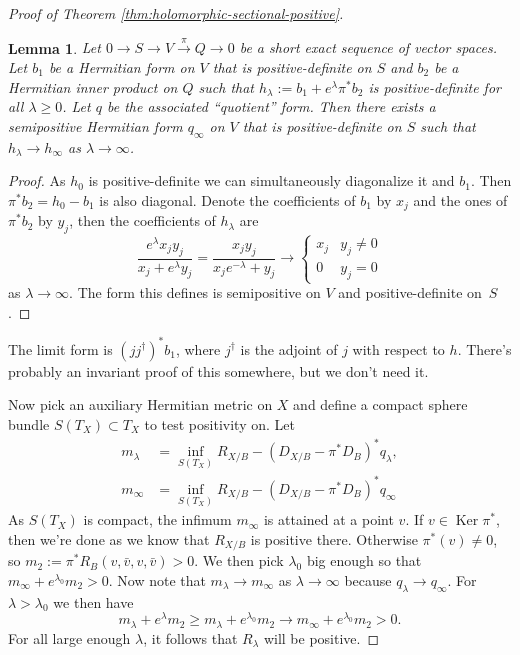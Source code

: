\documentclass[10pt,a4paper]{amsart}
\newtheorem{lemm}[theo]{Lemma}
\theoremstyle{definition}
\DeclareMathOperator{\Ker}{Ker}
\begin{document}
\begin{proof}[Proof of Theorem \ref{thm:holomorphic-sectional-positive}]
\begin{lemm}
Let $0 \to S \to V \stackrel{\pi}{\to} Q \to 0$ be a short exact sequence of vector spaces.
Let $b_{1}$ be a Hermitian form on $V$ that is positive-definite on $S$ and $b_{2}$ be a Hermitian inner product on $Q$ such that $h_{\lambda} := b_{1} + e^{\lambda} \pi^{*} b_{2}$ is positive-definite for all $\lambda \geq 0$.
Let $q$ be the associated ``quotient'' form.
Then there exists a semipositive Hermitian form $q_{\infty}$ on $V$ that is positive-definite on $S$ such that $h_{\lambda} \to h_{\infty}$ as $\lambda \to \infty$.
\end{lemm}


\begin{proof}
As $h_{0}$ is positive-definite we can simultaneously diagonalize it and $b_{1}$.
Then $\pi^{*}b_{2} = h_{0} - b_{1}$ is also diagonal.
Denote the coefficients of $b_{1}$ by $x_{j}$ and the ones of $\pi^{*}b_{2}$ by $y_{j}$, then the coefficients of $h_{\lambda}$ are
\[
  \frac{e^{\lambda}x_{j} y_{j}}{x_{j} + e^{\lambda} y_{j}}
  = \frac{x_{j} y_{j}}{x_{j}e^{-\lambda} + y_{j}}
  \to
  \begin{cases}
    x_{j} & y_{j} \not= 0
    \\
    0 & y_{j} = 0
  \end{cases}
\]
as $\lambda \to \infty$.
The form this defines is semipositive on $V$ and positive-definite on~$S$.%
\end{proof}

The limit form is $(j j^{\dagger})^{*}b_{1}$, where $j^{\dagger}$ is the adjoint of $j$ with respect to $h$. There's probably an invariant proof of this somewhere, but we don't need it.

Now pick an auxiliary Hermitian metric on $X$ and define a compact sphere bundle
$S(T_X) \subset T_X$ to test positivity on.
Let
\begin{align*}
m_\lambda &=
\inf_{S(T_X)} R_{X/B}
- (D_{X/B} - \pi^* D_{B})^* q_{\lambda},
\\
m_\infty &=
\inf_{S(T_X)} R_{X/B}
- (D_{X/B} - \pi^* D_{B})^* q_{\infty}
\end{align*}
As $S(T_X)$ is compact, the infimum $m_\infty$ is attained at a point $v$.
If $v \in \Ker \pi^*$, then we're done as we know that $R_{X/B}$ is positive
there.
Otherwise $\pi^*(v) \not= 0$, so $m_2 := \pi^*R_B(v, \bar v, v, \bar v) > 0$.
We then pick $\lambda_0$ big enough so that $m_\infty + e^{\lambda_0} m_2 > 0$.
Now note that
$m_\lambda \to m_\infty$ as $\lambda \to \infty$ because $q_{\lambda} \to
q_{\infty}$.
For $\lambda > \lambda_0$ we then have
$$
m_\lambda + e^\lambda m_2
\geq m_\lambda + e^{\lambda_0} m_2
\to m_\infty  + e^{\lambda_0} m_2
> 0.
$$
For all large enough $\lambda$, it follows that $R_\lambda$ will be positive.
\end{proof}
\end{document}
